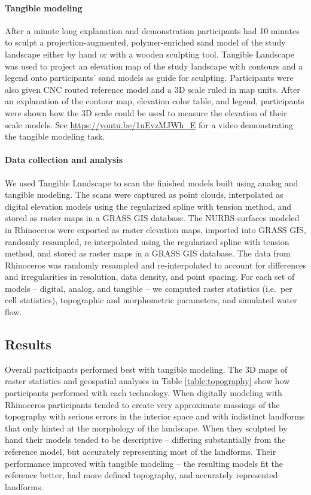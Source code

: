 \documentclass[Afour,sagev,times]{sagej} %
\begin{document}
\paragraph{Tangible modeling}
After a minute long explanation and demonstration
participants had 10 minutes to sculpt
a projection-augmented, polymer-enriched sand model
of the study landscape 
either by hand or with a wooden sculpting tool.
Tangible Landscape was used to project 
an elevation map of the study landscape
with contours and a legend
onto participants' sand models as guide for sculpting. 
Participants were also given CNC routed reference model and 
a 3D scale ruled in map units. 
After an explanation of the contour map, elevation color table, and legend,
participants were shown how the 3D scale could be used to 
measure the elevation of their scale models.
See \url{https://youtu.be/1uEvzMJWh_E}
for a video demonstrating the tangible modeling task.

\paragraph{Data collection and analysis}
We used Tangible Landscape to scan the finished models 
built using analog and tangible modeling.
The scans were captured as point clouds, interpolated 
as digital elevation models 
using the regularized spline with tension method,
and stored as raster maps in a GRASS GIS database. 
The NURBS surfaces modeled in Rhinoceros 
were exported as raster elevation maps,
imported into GRASS GIS, randomly resampled, 
re-interpolated using the regularized spline with tension method, 
and stored as raster maps in a GRASS GIS database. 
The data from Rhinoceros 
was randomly resampled and re-interpolated to account for 
differences and irregularities in resolution, data density, and point spacing.
For each set of models -- digital, analog, and tangible --
we computed raster statistics (i.e.~per cell statistics), 
topographic and morphometric parameters, 
and simulated water flow.
%

\subsection{Results}
Overall participants performed best with tangible modeling.
%
The 3D maps of raster statistics and geospatial analyses in
Table \ref{table:topography} 
show how participants performed with each technology.
%
When digitally modeling with Rhinoceros 
participants tended to 
create very approximate massings of the topography
with serious errors in the interior space and
with indistinct landforms
that only hinted at the morphology of the landscape.
%
When they sculpted by hand
their models tended to be descriptive -- 
differing substantially from the reference model, but
accurately representing most of the landforms. 
%
Their performance improved 
with tangible modeling --
the resulting models
fit the reference better, 
had more defined topography, 
and accurately represented landforms.
\end{document}
